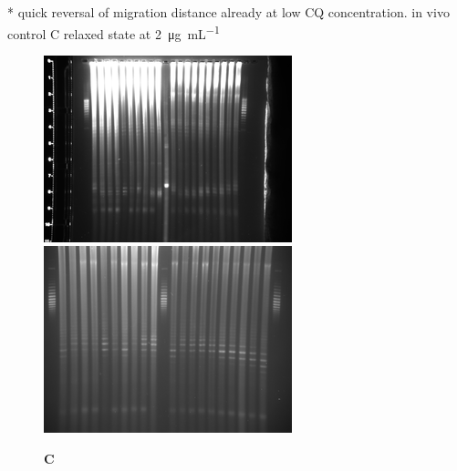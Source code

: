 \documentclass[10pt,letterpaper]{article}
\newcommand{\ugml}{\micro\gram\per\milli\liter}
\begin{document}
* quick reversal of migration distance already at low CQ
concentration. in vivo control C  relaxed state at \SI{2}{\ugml}




\begin{figure}[ht!]
  \begin{minipage}{.49\textwidth}
    \includegraphics[width=\textwidth]{figures/diurnal/Y_CQ01_high_exposure.png}
  \end{minipage}
  \begin{minipage}{.49\textwidth}
    \includegraphics[width=\textwidth]{figures/diurnal/20130618_1511.png}
  \end{minipage}
  
  \vspace{-.5cm}
  \textbf{C}
  \vspace{.25cm}
  

\end{figure}
\end{document}
